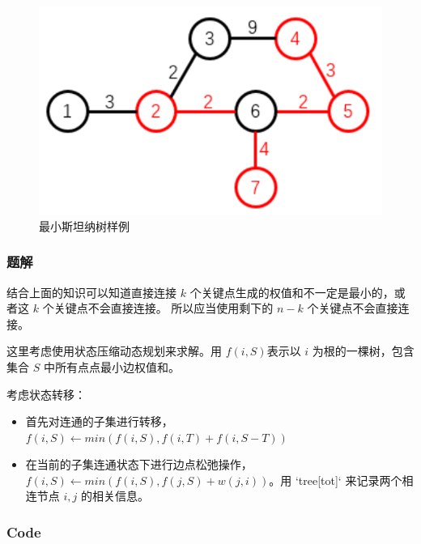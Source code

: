 \documentclass{SCIS2022cn}
\begin{document}
\begin{figure}[htbp]
    \centering
    \includegraphics{img/pic3.png}
    \caption{最小斯坦纳树样例}
    \label{pic3}
\end{figure}

\subsubsection*{题解}

结合上面的知识可以知道直接连接 $k$ 个关键点生成的权值和不一定是最小的，或者这 $k$ 个关键点不会直接连接。
所以应当使用剩下的 $n-k$ 个关键点不会直接连接。

这里考虑使用状态压缩动态规划来求解。用 $f(i,S)$表示以 $i$ 为根的一棵树，包含集合 $S$ 中所有点点最小边权值和。

考虑状态转移：
\begin{itemize}
    \item 首先对连通的子集进行转移，$f(i,S) \leftarrow min(f(i,S),f(i,T)+f(i,S-T))$
    \item 在当前的子集连通状态下进行边点松弛操作，$f(i,S) \leftarrow min(f(i,S),f(j,S)+w(j,i))$。用 `tree[tot]` 来记录两个相连节点 $i,j$ 的相关信息。
\end{itemize}

\subsubsection*{Code}
\end{document}
